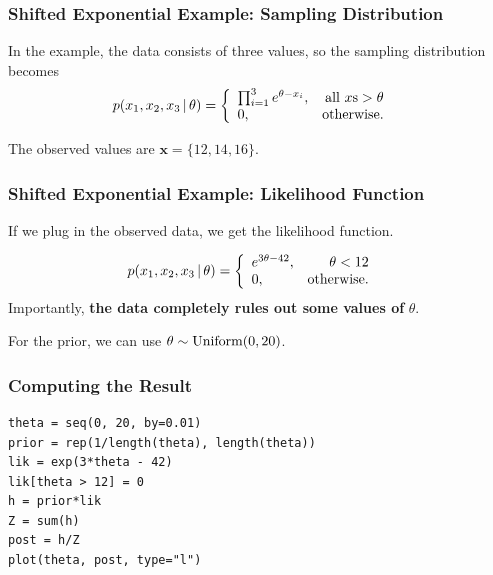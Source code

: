 \documentclass{beamer}
\newcommand{\given}{\,|\,}
\begin{document}
\begin{frame}[fragile]
\frametitle{Shifted Exponential Example: Sampling Distribution}
In the example, the data consists of three values, so the sampling distribution
becomes
\begin{align}
p(x_1, x_2, x_3 \given \theta)
    &= \left\{
    \begin{array}{lr}
     \prod_{i=1}^3  e^{\theta - x_i}, & \textnormal{all }x\textnormal{s} > \theta \\
    0,              & \textnormal{otherwise.}
    \end{array}
    \right.
\end{align}

\pause

The observed values are $\boldsymbol{x} = \{12, 14, 16\}$.


\end{frame}


\begin{frame}[fragile]
\frametitle{Shifted Exponential Example: Likelihood Function}
If we plug in the observed data, we get the likelihood function.

\begin{align}
p(x_1, x_2, x_3 \given \theta)
    &= \left\{
    \begin{array}{lr}
    e^{3\theta - 42}, & \theta < 12\\
    0,              & \textnormal{otherwise.}
    \end{array}
    \right.
\end{align}
Importantly, {\bf the data completely rules out some values of} $\theta$.
\pause

For the prior, we can use $\theta \sim \textnormal{Uniform}(0, 20)$.
\end{frame}



\begin{frame}[fragile]
\frametitle{Computing the Result}
\begin{verbatim}
theta = seq(0, 20, by=0.01)
prior = rep(1/length(theta), length(theta))
lik = exp(3*theta - 42)
lik[theta > 12] = 0
h = prior*lik
Z = sum(h)
post = h/Z
plot(theta, post, type="l")
\end{verbatim}

\end{frame}
\end{document}
